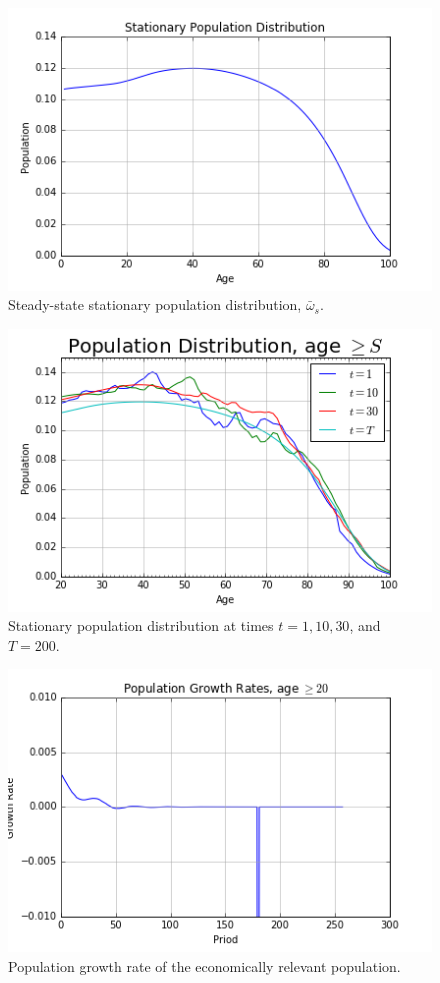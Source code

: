 \documentclass[letterpaper,12pt]{article}
\theoremstyle{definition}
\begin{document}
\begin{figure}[h!]
\centering
\includegraphics[scale=.8]{code/images/stat_pop}
\caption{Steady-state stationary population distribution, $\bar{\omega}_s$.}
\end{figure}

\begin{figure}[h!]
\centering
\includegraphics[scale=.8]{code/images/stat_pop_T}
\caption{Stationary population distribution at times $t = 1, 10, 30$, and $T=200$.}
\end{figure}

\begin{figure}[h!]
\centering
\includegraphics[scale=.8]{code/images/growth_rate_pop}
\caption{Population growth rate of the economically relevant population.}
\end{figure}
\end{document}
